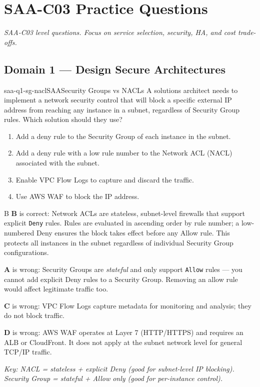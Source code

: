 
\section{SAA-C03 Practice Questions}
\label{sec:saa-questions}

\textit{SAA-C03 level questions. Focus on service selection, security, HA, and cost trade-offs.}


\subsection{Domain 1 --- Design Secure Architectures}

\begin{question}{saa-q1-sg-nacl}{SAA}{Security Groups vs NACLs}
A solutions architect needs to implement a network security control that will block a specific external IP address from reaching any instance in a subnet, regardless of Security Group rules. Which solution should they use?

\begin{enumerate}[label=\Alph*.]
  \item Add a deny rule to the Security Group of each instance in the subnet.
  \item Add a deny rule with a low rule number to the Network ACL (NACL) associated with the subnet.
  \item Enable VPC Flow Logs to capture and discard the traffic.
  \item Use AWS WAF to block the IP address.
\end{enumerate}
\end{question}

\begin{answer}{B}
\textbf{B} is correct: Network ACLs are stateless, subnet-level firewalls that support explicit \texttt{Deny} rules. Rules are evaluated in ascending order by rule number; a low-numbered Deny ensures the block takes effect before any Allow rule. This protects all instances in the subnet regardless of individual Security Group configurations.

\textbf{A} is wrong: Security Groups are \emph{stateful} and only support \texttt{Allow} rules --- you cannot add explicit Deny rules to a Security Group. Removing an allow rule would affect legitimate traffic too.

\textbf{C} is wrong: VPC Flow Logs capture metadata for monitoring and analysis; they do not block traffic.

\textbf{D} is wrong: AWS WAF operates at Layer 7 (HTTP/HTTPS) and requires an ALB or CloudFront. It does not apply at the subnet network level for general TCP/IP traffic.

\textit{Key: NACL = stateless + explicit Deny (good for subnet-level IP blocking). Security Group = stateful + Allow only (good for per-instance control).}
\end{answer}

